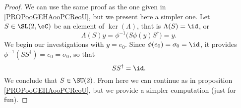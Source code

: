 \begin{proof}
    We can use the same proof as the one given in \ref{PROPooGEHAooPCReoU}, but we present here a simpler one. Let \( S\in \SL(2,\eC)\) be an element of \( \ker(\Lambda)\), that is \( \Lambda(S)=\id\), or
    \begin{equation}
        \Lambda(S)y=\phi^{-1}\big( S\phi(y)S^{\dag} \big)=y.
    \end{equation}
    We begin our investigations with \( y=e_0\). Since \( \phi(e_0)=\sigma_0=\id\), it provides \( \phi^{-1}(SS^{\dag})=e_0=\sigma_0\), so that
    \begin{equation}
        SS^{\dag}=\id.
    \end{equation}
    We conclude that \( S\in \SU(2)\). From here we can continue as in proposition \ref{PROPooGEHAooPCReoU}, but we provide a simpler computation (just for fun).


\end{proof}
